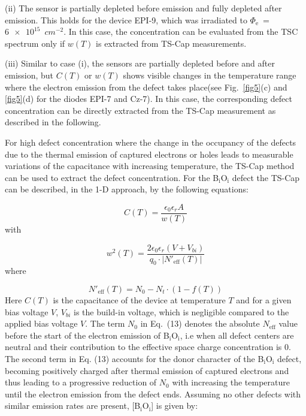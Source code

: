 \documentclass[final, 5p, times]{elsarticle}
\begin{document}
(ii) The sensor is partially depleted before emission and fully depleted after emission. This holds for the device EPI-9, which was irradiated to $\Phi_\text{e}$~=~$\num{6e15}$~$\si{cm^{-2}}$. In this case, the concentration can be evaluated from the TSC spectrum only if $w(T)$ is extracted from TS-Cap measurements.
\par
(iii) Similar to case (i), the sensors are partially depleted before and after emission, but $C(T)$ or $w(T)$ shows visible changes in the temperature range where the electron emission from the defect takes place(see Fig.~\ref{fig5}(c) and \ref{fig5}(d) for the diodes EPI-7 and Cz-7). In this case, the corresponding defect concentration can be directly extracted from the TS-Cap measurement as described in the following.
\par
For high defect concentration where the change in the occupancy of the defects due to the thermal emission of captured electrons or holes leads to measurable variations of the capacitance with increasing temperature, the TS-Cap method can be used to extract the defect concentration. For the B$_\text{i}$O$_\text{i}$ defect the TS-Cap can be described, in the 1-D approach, by the following equations:
\par
\begin{equation}
C(T) =  \frac{ \epsilon_0  \epsilon_r  A}{w(T)}  
\end{equation} 
with
\par
\begin{equation}
w^2 (T) = \frac{2  \epsilon_0  \epsilon_r  (V+V_{bi})}{q_0  
\cdot \lvert N'_\text{eff} (T) \rvert}
\end{equation} 
where
\par
\begin{equation} 
N'_\text{eff}(T) =  N_0 - N_t \cdot (1-f(T))
\end{equation}
Here $C(T)$ is the capacitance of the device at temperature $T$ and for a given
bias voltage $V$, $V_{bi}$ is the build-in voltage, which is negligible compared to the applied bias voltage $V$. The term $N_0$ in Eq.~(13) denotes the absolute $N_\text{eff}$ value before the start of the electron emission of B$_\text{i}$O$_\text{i}$, i.e when all defect centers are neutral and their contribution to the effective space charge concentration is 0. The second term in Eq. (13) accounts for the donor character of the B$_\text{i}$O$_\text{i}$ defect, becoming positively charged after thermal emission of captured electrons and thus leading to a progressive reduction of $N_0$ with increasing the temperature until the electron emission from the defect ends. Assuming no other defects with similar emission rates are present, [B$_\text{i}$O$_\text{i}$] is given by: 
\end{document}
